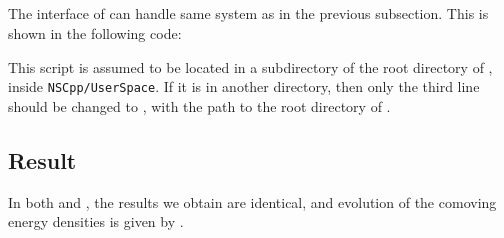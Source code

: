 \documentclass[11pt,a4paper]{article}
\begin{document}
\subsection{\PY}
%
The \PY interface of \nsc can handle same system as in the previous subsection. This is shown in the following code:
%
\lstset{language = python}

%
This script is assumed to be located in a subdirectory of the root directory of \nsc, \eg inside {\tt NSCpp/UserSpace}. If it is in another directory, then only the third line should be changed to , with  the path to the root directory of \nsc.


\subsection{Result} 
%
In both \CPP and \PY, the results we obtain are identical, and evolution of the comoving energy densities is given by . 
%
\end{document}
